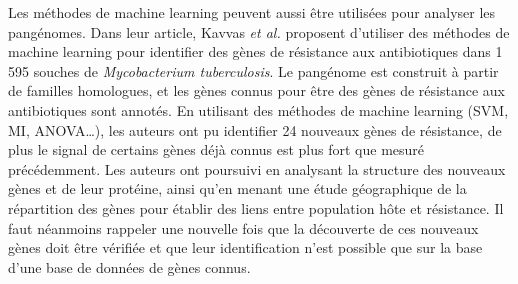 Les méthodes de machine learning peuvent aussi être utilisées pour analyser les pangénomes. Dans leur article, Kavvas \textit{et al.} \cite{kavvas_machine_2018} proposent d'utiliser des méthodes de machine learning pour identifier des gènes de résistance aux antibiotiques dans 1 595 souches de \textit{Mycobacterium tuberculosis}. Le pangénome est construit à partir de familles homologues, et les gènes connus pour être des gènes de résistance aux antibiotiques sont annotés. En utilisant des méthodes de machine learning (SVM, MI, ANOVA\dots), les auteurs ont pu identifier 24 nouveaux gènes de résistance, de plus le signal de certains gènes déjà connus est plus fort que mesuré précédemment. Les auteurs ont poursuivi en analysant la structure des nouveaux gènes et de leur protéine, ainsi qu'en menant une étude géographique de la répartition des gènes pour établir des liens entre population hôte et résistance. Il faut néanmoins rappeler une nouvelle fois que la découverte de ces nouveaux gènes doit être vérifiée et que leur identification n'est possible que sur la base d'une base de données de gènes connus.

